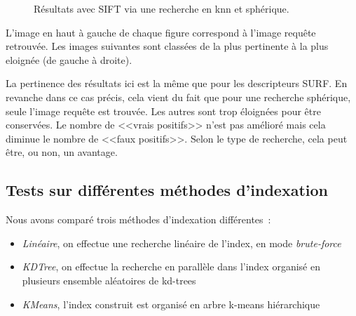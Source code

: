 \documentclass{article}
\begin{document}
\begin{figure}[!ht]%
  \centering
  \hspace{0.01\textwidth}
  \caption{Résultats avec SIFT via une recherche en knn et sphérique.}
  \label{sift}
\end{figure}

L'image en haut à gauche de chaque figure correspond à l'image requête retrouvée. Les images suivantes sont
classées de la plus pertinente à la plus eloignée (de gauche à droite).

La pertinence des résultats ici est la même que pour les descripteurs SURF. En revanche dans ce cas précis, cela vient du fait que pour une recherche sphérique,
seule l'image requête est trouvée. Les autres sont trop éloignées pour être conservées. Le nombre de <<vrais
positifs>> n'est pas amélioré mais cela diminue 
le nombre de <<faux positifs>>. Selon le type de recherche, cela peut être, ou non, un avantage.

\subsection{Tests sur différentes méthodes d'indexation}

Nous avons comparé trois méthodes d'indexation différentes~:

\begin{itemize}
    \item {\em Linéaire}, on effectue une recherche linéaire de l'index, en mode {\em brute-force}
    \item {\em KDTree}, on effectue la recherche en parallèle dans l'index organisé en plusieurs ensemble aléatoires de kd-trees
    \item {\em KMeans}, l'index construit est organisé en arbre k-means hiérarchique
\end{itemize}
\end{document}
